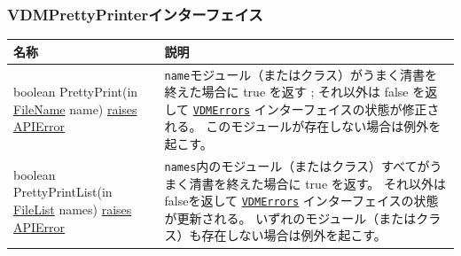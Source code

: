 \documentclass[\pformat,12pt]{jarticle}
\newcommand{\pbs}[1]{\let\temp=\\#1\let\\=\temp}
\newenvironment{interfacetable}{%
  \begin{longtable}{|>{\pbs\raggedright\ttfamily}p{6.6cm}%
                    |>{\pbs\raggedright}p{6.6cm}|} \hline
  \textrm{\bfseries 名称} &  \textbf{説明} \\ \hline
  \endhead
  }{\end{longtable}}
\newcommand{\APIError}{\hyperlink{exception.APIError}{raises APIError}}
\newcommand{\FileName}{\hyperlink{type.FileName}{FileName}}
\newcommand{\FileList}{\hyperlink{type.FileList}{FileList}}
\newcommand{\VDMErrors}{\hyperlink{interface.VDMErrors}{VDMErrors}}
\begin{document}
\subsubsection{VDMPrettyPrinterインターフェイス}
\mbox{}
\begin{interfacetable}
boolean PrettyPrint(in {\FileName} name) \APIError
  & \texttt{name}モジュール（またはクラス）がうまく清書を終えた場合に \textsf{true} を返す
    ; それ以外は \textsf{false} を返して
    \texttt{\VDMErrors} インターフェイスの状態が修正される。
    このモジュールが存在しない場合は例外を起こす。
\\ \hline
boolean PrettyPrintList(in {\FileList} names) \APIError
  & \texttt{names}内のモジュール（またはクラス）すべてがうまく清書を終えた場合に \textsf{true} を返す。
    それ以外は\textsf{false}を返して
    \texttt{\VDMErrors} インターフェイスの状態が更新される。
    いずれのモジュール（またはクラス）も存在しない場合は例外を起こす。
\\ \hline
\end{interfacetable}
\end{document}
